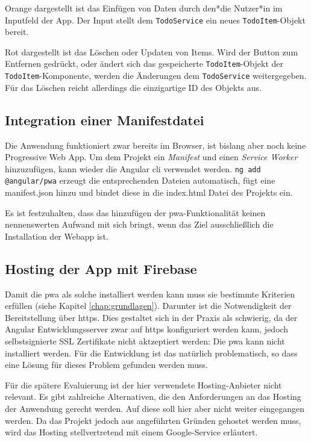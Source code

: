 Orange dargestellt ist das Einfügen von Daten durch den*die Nutzer*in im Inputfeld der App. Der Input stellt dem \texttt{TodoService} ein neues \texttt{TodoItem}-Objekt bereit.

Rot dargestellt ist das Löschen oder Updaten von Items. Wird der Button zum Entfernen gedrückt, oder ändert sich das gespeicherte \texttt{TodoItem}-Objekt der \texttt{TodoItem}-Komponente, werden die Änderungen dem \texttt{TodoService} weitergegeben.
Für das Löschen reicht allerdings die einzigartige ID des Objekts aus.



\subsection{Integration einer Manifestdatei}

Die Anwendung funktioniert zwar bereits im Browser, ist bislang aber noch keine Progressive Web App. Um dem Projekt ein \textit{Manifest} und einen \textit{Service Worker} hinzuzufügen, kann wieder die Angular \ac{cli} verwendet werden. \texttt{ng add @angular/pwa} erzeugt die entsprechenden Dateien automatisch, fügt eine manifest.json hinzu und bindet diese in die index.html Datei des Projekts ein.

Es ist festzuhalten, dass das hinzufügen der \ac{pwa}-Funktionalität keinen nennenswerten Aufwand mit sich bringt, wenn das Ziel ausschließlich die Installation der Webapp ist.

\subsection{Hosting der App mit Firebase}
Damit die \ac{pwa} als solche installiert werden kann muss sie bestimmte Kriterien erfüllen (siehe Kapitel \ref{chap:grundlagen}). Darunter ist die Notwendigkeit der Bereitstellung über \ac{https}. Dies gestaltet sich in der Praxis als schwierig, da der Angular Entwicklungsserver zwar auf \ac{https} konfiguriert werden kann, jedoch selbstsignierte SSL Zertifikate nicht aktzeptiert werden: Die \ac{pwa} kann nicht installiert werden. Für die Entwicklung ist das natürlich problematisch, so dass eine Lösung für dieses Problem gefunden werden muss.

Für die spätere Evaluierung ist der hier verwendete Hosting-Anbieter nicht relevant. Es gibt zahlreiche Alternativen, die den Anforderungen an das Hosting der Anwendung gerecht werden. Auf diese soll hier aber nicht weiter eingegangen werden. Da das Projekt jedoch aus angeführten Gründen gehostet werden muss, wird das Hosting stellvertretend mit einem Google-Service erläutert.

